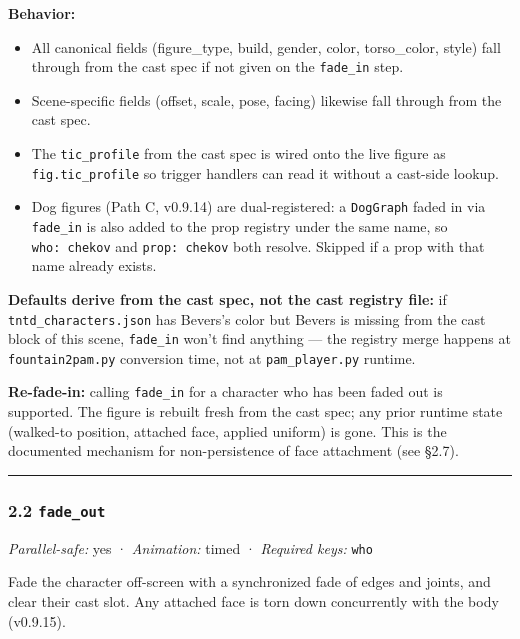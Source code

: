 \documentclass[
  12pt,
  letterpaper,
]{book}
\providecommand{\tightlist}{%
  \setlength{\itemsep}{0pt}\setlength{\parskip}{0pt}}
\begin{document}
\textbf{Behavior:}

\begin{itemize}
\tightlist
\item
  All canonical fields (figure\_type, build, gender, color,
  torso\_color, style) fall through from the cast spec if not given on
  the \texttt{fade\_in} step.
\item
  Scene-specific fields (offset, scale, pose, facing) likewise fall
  through from the cast spec.
\item
  The \texttt{tic\_profile} from the cast spec is wired onto the live
  figure as \texttt{fig.tic\_profile} so trigger handlers can read it
  without a cast-side lookup.
\item
  Dog figures (Path C, v0.9.14) are dual-registered: a \texttt{DogGraph}
  faded in via \texttt{fade\_in} is also added to the prop registry
  under the same name, so \texttt{who:\ chekov} and
  \texttt{prop:\ chekov} both resolve. Skipped if a prop with that name
  already exists.
\end{itemize}

\textbf{Defaults derive from the cast spec, not the cast registry file:}
if \texttt{tntd\_characters.json} has Bevers's color but Bevers is
missing from the cast block of this scene, \texttt{fade\_in} won't find
anything --- the registry merge happens at \texttt{fountain2pam.py}
conversion time, not at \texttt{pam\_player.py} runtime.

\textbf{Re-fade-in:} calling \texttt{fade\_in} for a character who has
been faded out is supported. The figure is rebuilt fresh from the cast
spec; any prior runtime state (walked-to position, attached face,
applied uniform) is gone. This is the documented mechanism for
non-persistence of face attachment (see §2.7).

\begin{center}\rule{0.5\linewidth}{0.5pt}\end{center}

\subsubsection{\texorpdfstring{2.2
\texttt{fade\_out}}{2.2 fade\_out}}\label{fade_out}

\emph{Parallel-safe:} yes · \emph{Animation:} timed · \emph{Required
keys:} \texttt{who}

Fade the character off-screen with a synchronized fade of edges and
joints, and clear their cast slot. Any attached face is torn down
concurrently with the body (v0.9.15).
\end{document}
